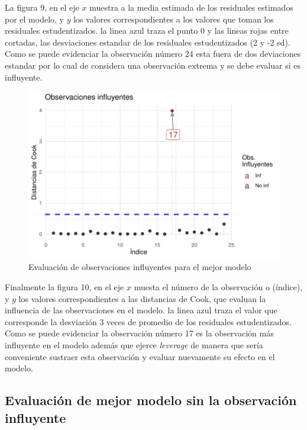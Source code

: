 \documentclass[
]{article}
\begin{document}
La figura 9, en el eje \(x\) muestra a la media estimada de los
residuales estimados por el modelo, y \(y\) los valores correspondientes
a los valores que toman los residuales estudentizados. la linea azul
traza el punto 0 y las lineas rojas entre cortadas, las desviaciones
estandar de los residuales estudentizados (2 y -2 sd). Como se puede
evidenciar la observación número 24 esta fuera de dos deviaciones
estandar por lo cual de considera una observación extrema y se debe
evaluar si es influyente.

\begin{figure}
\centering
\includegraphics{diagnosticorrpp_files/figure-latex/observaciones influyentes para bestmodel-1.pdf}
\caption{Evaluación de observaciones influyentes para el mejor modelo}
\end{figure}

Finalmente la figura 10, en el eje \(x\) muesta el número de la
observación o (índice), y \(y\) los valores correspondientes a las
distancias de Cook, que evaluan la influencia de las observaciones en el
modelo. la linea azul traza el valor que corresponde la desviación 3
veces de promedio de los residuales estudentizados. Como se puede
evidenciar la observación número 17 es la observación más influyente en
el modelo además que ejerce \emph{leverage} de manera que sería
conveniente sustraer esta observación y evaluar nuevamente su efecto en
el modelo.

\hypertarget{evaluaciuxf3n-de-mejor-modelo-sin-la-observaciuxf3n-influyente}{%
\subsection{Evaluación de mejor modelo sin la observación
influyente}\label{evaluaciuxf3n-de-mejor-modelo-sin-la-observaciuxf3n-influyente}}
\end{document}
